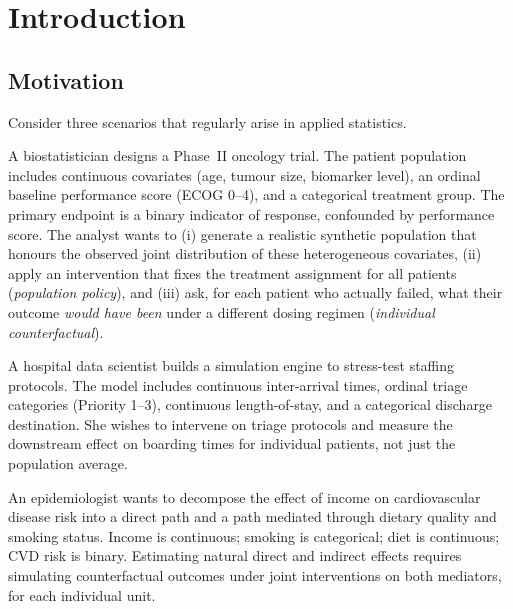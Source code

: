 \documentclass[article]{jss}
\begin{document}
\tableofcontents
\newpage

\section{Introduction}
\label{sec:intro}

\subsection{Motivation}

Consider three scenarios that regularly arise in applied statistics.

\begin{example}
A biostatistician designs a Phase~II oncology trial. The patient population includes
continuous covariates (age, tumour size, biomarker level), an ordinal baseline
performance score (ECOG 0--4), and a categorical treatment group. The primary
endpoint is a binary indicator of response, confounded by performance score. The
analyst wants to (i) generate a realistic synthetic population that honours the
observed joint distribution of these heterogeneous covariates, (ii) apply an
intervention that fixes the treatment assignment for all patients (\emph{population
policy}), and (iii) ask, for each patient who actually failed, what their outcome
\emph{would have been} under a different dosing regimen (\emph{individual
counterfactual}).
\end{example}

\begin{example}
A hospital data scientist builds a simulation engine to stress-test staffing
protocols. The model includes continuous inter-arrival times, ordinal triage
categories (Priority 1--3), continuous length-of-stay, and a categorical discharge
destination. She wishes to intervene on triage protocols and measure the
downstream effect on boarding times for individual patients, not just the
population average.
\end{example}

\begin{example}
An epidemiologist wants to decompose the effect of income on cardiovascular
disease risk into a direct path and a path mediated through dietary quality and
smoking status. Income is continuous; smoking is categorical; diet is continuous;
CVD risk is binary. Estimating natural direct and indirect effects requires
simulating counterfactual outcomes under joint interventions on both mediators,
for each individual unit.
\end{example}
\end{document}

